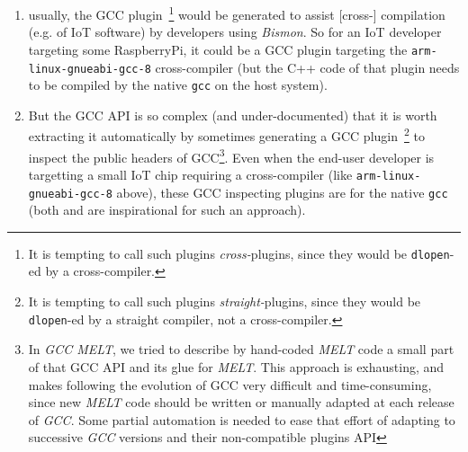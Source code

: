 \begin{itemize}
    \begin{enumerate}
      \item usually, the GCC plugin~\footnote{It is tempting to call
        such plugins \emph{cross-}plugins, since they would be
        \texttt{dlopen}-ed by a cross-compiler.} would be generated to
        assist [cross-] compilation (e.g. of IoT software) by
        developers using \emph{Bismon}. So for an IoT developer
        targeting some RaspberryPi, it could be a GCC plugin
        targeting the \texttt{arm-linux-gnueabi-gcc-8} cross-compiler
        (but the C++ code of that plugin needs to be compiled by the
        native \texttt{gcc} on the host system).
        
      \item But the GCC API is so complex (and under-documented) that
        it is worth extracting it automatically by sometimes
        generating a GCC plugin~\footnote{It is tempting to call such
          plugins \emph{straight-}plugins, since they would be
          \texttt{dlopen}-ed by a straight compiler, not a
          cross-compiler.} to inspect the public headers of
        GCC\footnote{In \emph{GCC MELT}, we tried to describe by
          hand-coded \emph{MELT} code a small part of that GCC API and
          its glue for \emph{MELT}. This approach is exhausting, and
          makes following the evolution of GCC very difficult and
          time-consuming, since new \emph{MELT} code should be written
          or manually adapted at each release of \emph{GCC}. Some
          partial automation is needed to ease that effort of adapting
          to successive \emph{GCC} versions and their non-compatible
          plugins API}. Even when the end-user developer is targetting
        a small IoT chip requiring a cross-compiler (like
        \texttt{arm-linux-gnueabi-gcc-8} above), these GCC inspecting
        plugins are for the native \texttt{gcc} (both
        \cite{Schafmeister:2016:CANDO} and
        \cite{Schafmeister:2015:CLASP} are inspirational for such an
        approach).
        
    \end{enumerate}


\end{itemize}
